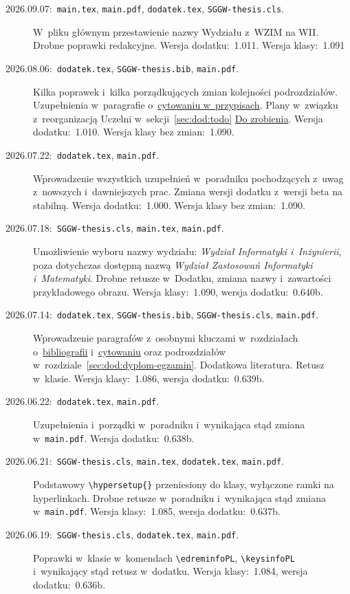 \begin{description}
\item[\rm 2026.09.07:~{\tt main.tex}, {\tt main.pdf}, {\tt dodatek.tex}, {\tt SGGW-thesis.cls}.] W~pliku głównym przestawienie nazwy Wydziału z~WZIM na WII. Drobne poprawki redakcyjne. Wersja dodatku:~1.011. Wersja klasy:~1.091
\item[\rm 2026.08.06:~{\tt dodatek.tex}, {\tt SGGW-thesis.bib}, {\tt main.pdf}.] Kilka poprawek i~kilka porządkujących zmian kolejności podrozdziałów. Uzupełnienia w~paragrafie o~\hyperref[sec:dod:cytowanie-przypisy]{cytowaniu w~przypisach}. Plany w~związku z~reorganizacją Uczelni w~sekcji~\ref{sec:dod:todo} \hyperref[sec:dod:todo]{Do zrobienia}. Wersja dodatku:~1.010. Wersja klasy bez zmian:~1.090.
\item[\rm 2026.07.22:~{\tt dodatek.tex}, {\tt main.pdf}.] Wprowadzenie wszystkich uzupełnień w~poradniku pochodzących z~uwag z~nowszych i~dawniejszych prac. Zmiana wersji dodatku z~wersji beta na stabilną. Wersja dodatku:~1.000. Wersja klasy bez zmian:~1.090.
\item[\rm 2026.07.18:~{\tt SGGW-thesis.cls}, {\tt main.tex}, {\tt main.pdf}.]\mbox{}\linebreak Umożliwienie wyboru nazwy wydziału: {\em Wydział Informatyki i~Inżynierii}, poza dotychczas dostępną nazwą {\em Wydział Zastosowań Informatyki i~Matematyki}. Drobne retusze w~Dodatku, zmiana nazwy i~zawartości przykładowego obrazu. Wersja klasy:~1.090, wersja dodatku:~0.640b.
\item[\rm 2026.07.14:~{\tt dodatek.tex}, {\tt SGGW-thesis.bib}, {\tt SGGW-thesis.cls}, {\tt main.pdf}.]\mbox{}\linebreak Wprowadzenie paragrafów z~osobnymi kluczami w~rozdziałach o~\hyperref[sec:dod:bibliografia]{bibliografii} i~\hyperref[sec:dod:cytowanie]{cytowaniu} oraz podrozdziałów w~rozdziale~\ref{sec:dod:dyplom-egzamin}. Dodatkowa literatura. Retusz w~klasie. Wersja klasy:~1.086, wersja dodatku:~0.639b.
\item[\rm 2026.06.22:~{\tt dodatek.tex}, {\tt main.pdf}.] Uzupełnienia i~porządki w~poradniku i~wynikająca stąd zmiana w~{\tt main.pdf}. Wersja dodatku:~0.638b.
\item[\rm 2026.06.21:~{\tt SGGW-thesis.cls}, {\tt main.tex}, {\tt dodatek.tex}, {\tt main.pdf}.]\mbox{}\linebreak Podstawowy \verb+\hypersetup{}+ przeniesiony do klasy, wyłączone ramki na hyperlinkach. Drobne retusze w~poradniku i~wynikająca stąd zmiana w~{\tt main.pdf}. Wersja klasy:~1.085, wersja dodatku:~0.637b.
\item[\rm 2026.06.19:~{\tt SGGW-thesis.cls}, {\tt dodatek.tex}, {\tt main.pdf}.] Poprawki w~klasie w~komendach \verb+\edreminfoPL+, \verb+\keysinfoPL+ i~wynikający stąd retusz w~dodatku. Wersja klasy:~1.084, wersja dodatku:~0.636b.

\end{description}
